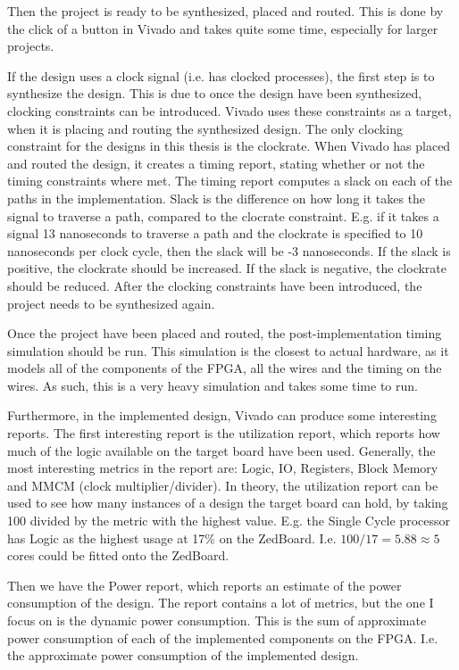 Then the project is ready to be synthesized, placed and routed. This is done by
the click of a button in Vivado and takes quite some time, especially for
larger projects.

If the design uses a clock signal (i.e. has clocked processes), the first step
is to synthesize the design. This is due to once the design have been
synthesized, clocking constraints can be introduced. Vivado uses these
constraints as a target, when it is placing and routing the synthesized design.
The only clocking constraint for the designs in this thesis is the clockrate.
When Vivado has placed and routed the design, it creates a timing report,
stating whether or not the timing constraints where met. The timing report
computes a slack on each of the paths in the implementation. Slack is the
difference on how long it takes the signal to traverse a path, compared to the
clocrate constraint. E.g. if it takes a signal 13 nanoseconds to traverse a
path and the clockrate is specified to 10 nanoseconds per clock cycle, then the
slack will be -3 nanoseconds. If the slack is positive, the clockrate should be
increased. If the slack is negative, the clockrate should be reduced.  After
the clocking constraints have been introduced, the project needs to be
synthesized again.

Once the project have been placed and routed, the post-implementation timing
simulation should be run. This simulation is the closest to actual hardware, as
it models all of the components of the FPGA, all the wires and the timing on
the wires. As such, this is a very heavy simulation and takes some time to run.

Furthermore, in the implemented design, Vivado can produce some interesting
reports. The first interesting report is the utilization report, which reports
how much of the logic available on the target board have been used. Generally,
the most interesting metrics in the report are: Logic, IO, Registers, Block
Memory and MMCM (clock multiplier/divider). In theory, the utilization report
can be used to see how many instances of a design the target board can hold, by
taking 100 divided by the metric with the highest value. E.g. the Single Cycle
processor has Logic as the highest usage at 17\% on the ZedBoard. I.e.
$100/17=5.88\approx5$ cores could be fitted onto the ZedBoard.

Then we have the Power report, which reports an estimate of the power
consumption of the design. The report contains a lot of metrics, but the one I
focus on is the dynamic power consumption. This is the sum of approximate power
consumption of each of the implemented components on the FPGA. I.e. the
approximate power consumption of the implemented design.

